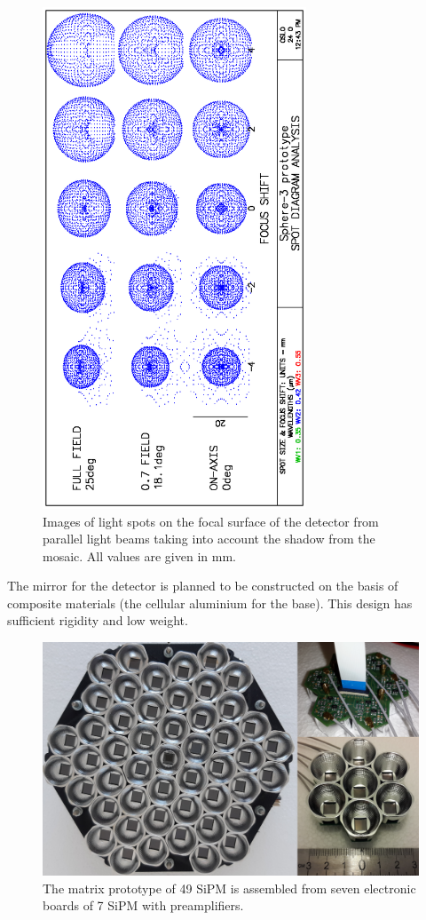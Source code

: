 \documentclass[a4paper,11pt]{article}
\begin{document}
\begin{figure}[bt]
\centering
\includegraphics[width=0.7\textwidth]{Sphere3spot.eps}
\caption{Images of light spots on the focal surface of the detector from parallel light beams taking into account the shadow from the mosaic. All values are given in mm.}
\label{fig:spots}
\end{figure}    

The mirror for the detector is planned to be constructed on the basis of composite materials (the cellular aluminium for the base). This design has sufficient rigidity and low weight.

\begin{figure}[t]
\centering %
\includegraphics[width=.55\textwidth]{mosaic_protype.png}
\caption{The matrix prototype of 49 SiPM is assembled from seven electronic boards of 7 SiPM with preamplifiers.}
\label{fig:mosaic49_7}
\end{figure}
\end{document}
